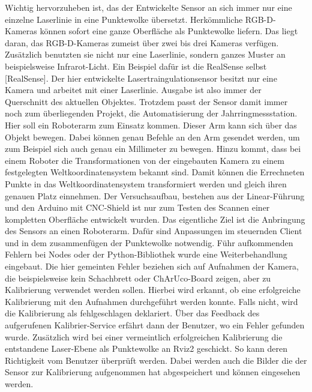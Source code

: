 	Wichtig hervorzuheben ist, das der Entwickelte Sensor an sich immer nur eine einzelne Laserlinie in eine Punktewolke übersetzt. Herkömmliche RGB-D-Kameras können sofort eine ganze Oberfläche als Punktewolke liefern. Das liegt daran, das RGB-D-Kameras zumeist über zwei bis drei Kameras verfügen. Zusätzlich benutzten sie nicht nur eine Laserlinie, sondern ganzes Muster an beispielsweise Infrarot-Licht. Ein Beispiel dafür ist die RealSense selbst [RealSense]. Der hier entwickelte Lasertraingulationsensor besitzt nur eine Kamera und arbeitet mit einer Laserlinie. Ausgabe ist also immer der Querschnitt des aktuellen Objektes. Trotzdem passt der Sensor damit immer noch zum überliegenden Projekt, die Automatisierung der Jahrringmessstation. Hier soll ein Roboterarm zum Einsatz kommen. Dieser Arm kann sich über das Objekt bewegen. Dabei können genau Befehle an den Arm gesendet werden, um zum Beispiel sich auch genau ein Millimeter zu bewegen. Hinzu kommt, dass bei einem Roboter die Transformationen von der eingebauten Kamera zu einem festgelegten Weltkoordinatensystem bekannt sind. Damit können die Errechneten Punkte in das Weltkoordinatensystem transformiert werden und gleich ihren genauen Platz einnehmen. Der Versuchsaufbau, bestehen aus der Linear-Führung und den Arduino mit CNC-Shield ist nur zum Testen des Scannen einer kompletten Oberfläche entwickelt wurden. Das eigentliche Ziel ist die Anbringung des Sensors an einen Roboterarm. Dafür sind Anpassungen im steuernden Client und in dem zusammenfügen der Punktewolke notwendig. \newline
	Führ aufkommenden Fehlern bei Nodes oder der Python-Bibliothek wurde eine Weiterbehandlung eingebaut. Die hier gemeinten Fehler beziehen sich auf Aufnahmen der Kamera, die beispielsweise kein Schachbrett oder ChArUco-Board zeigen, aber zu Kalibrierung verwendet werden sollen. Hierbei wird erkannt, ob eine erfolgreiche Kalibrierung mit den Aufnahmen durchgeführt werden konnte. Falls nicht, wird die Kalibrierung als fehlgeschlagen deklariert. Über das Feedback des aufgerufenen Kalibrier-Service erfährt dann der Benutzer, wo ein Fehler gefunden wurde. Zusätzlich wird bei einer vermeintlich erfolgreichen Kalibrierung die entstandene Laser-Ebene als Punktewolke an Rviz2 geschickt. So kann deren Richtigkeit vom Benutzer überprüft werden. Dabei werden auch die Bilder die der Sensor zur Kalibrierung aufgenommen hat abgespeichert und können eingesehen werden.
